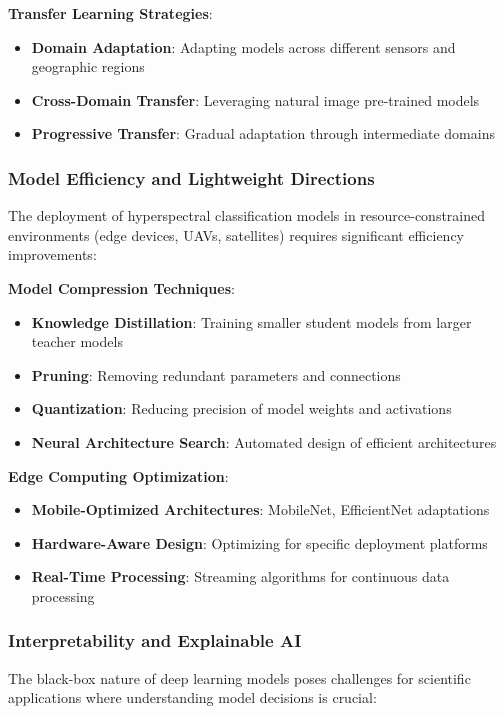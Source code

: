 \documentclass[journal]{IEEEtran}
\begin{document}
\textbf{Transfer Learning Strategies}:
\begin{itemize}
\item \textbf{Domain Adaptation}: Adapting models across different sensors and geographic regions
\item \textbf{Cross-Domain Transfer}: Leveraging natural image pre-trained models
\item \textbf{Progressive Transfer}: Gradual adaptation through intermediate domains
\end{itemize}

\subsubsection{Model Efficiency and Lightweight Directions}

The deployment of hyperspectral classification models in resource-constrained environments (edge devices, UAVs, satellites) requires significant efficiency improvements:

\textbf{Model Compression Techniques}:
\begin{itemize}
\item \textbf{Knowledge Distillation}: Training smaller student models from larger teacher models
\item \textbf{Pruning}: Removing redundant parameters and connections
\item \textbf{Quantization}: Reducing precision of model weights and activations
\item \textbf{Neural Architecture Search}: Automated design of efficient architectures
\end{itemize}

\textbf{Edge Computing Optimization}:
\begin{itemize}
\item \textbf{Mobile-Optimized Architectures}: MobileNet, EfficientNet adaptations
\item \textbf{Hardware-Aware Design}: Optimizing for specific deployment platforms
\item \textbf{Real-Time Processing}: Streaming algorithms for continuous data processing
\end{itemize}

\subsubsection{Interpretability and Explainable AI}

The black-box nature of deep learning models poses challenges for scientific applications where understanding model decisions is crucial:
\end{document}
